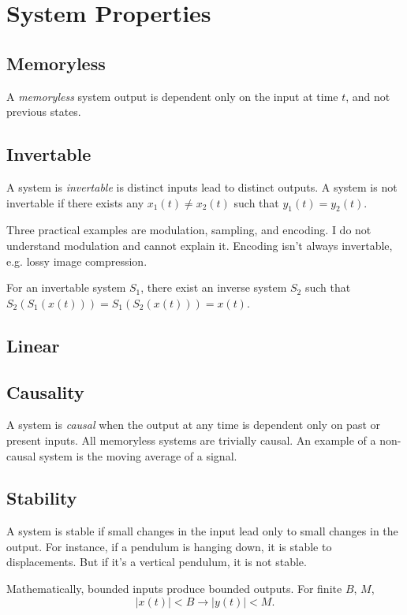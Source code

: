 \section{System Properties}

\subsection{Memoryless}
A \emph{memoryless} system output is dependent
only on the input at time $t$, and not previous states.

\subsection{Invertable}
A system is \emph{invertable} is distinct
inputs lead to distinct outputs. A system is not
invertable if there exists any $x_1(t) \neq x_2(t)$ such
that $y_1(t) = y_2(t)$.

Three practical examples are modulation, sampling,
and encoding. I do not understand modulation and
cannot explain it. Encoding isn't always invertable,
e.g. lossy image compression.

For an invertable system $S_1$, there exist an inverse system
$S_2$ such that $S_2(S_1(x(t))) = S_1(S_2(x(t))) = x(t)$.

\subsection{Linear}

\subsection{Causality}
A system is \emph{causal} when the output at any time
is dependent only on past or present inputs. All memoryless
systems are trivially causal. An example of a non-causal
system is the moving average of a signal.

\subsection{Stability}
A system is stable if small changes in the input
lead only to small changes in the output. For instance,
if a pendulum is hanging down, it is stable to displacements.
But if it's a vertical pendulum, it is not stable.

Mathematically, bounded inputs produce bounded outputs.
For finite $B$, $M$,
\begin{equation}
    |x(t)| < B \rightarrow |y(t)| < M.
\end{equation}
